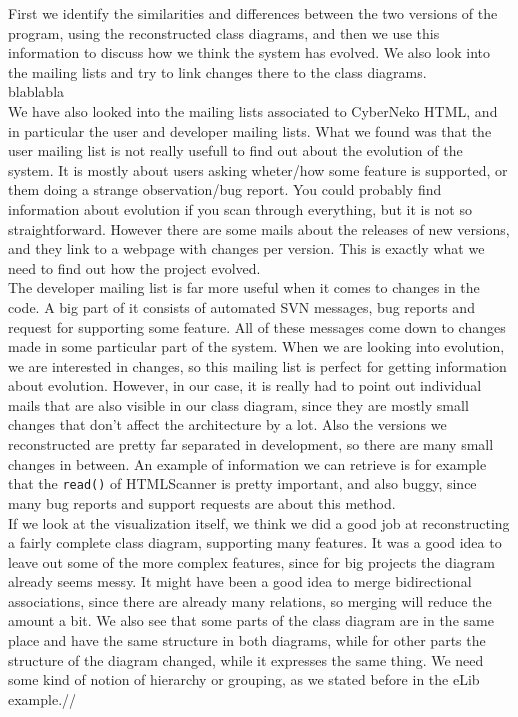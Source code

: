 \documentclass[a4paper,11pt]{article}
\begin{document}
			First we identify the similarities and differences between the two versions of the program, using the reconstructed class diagrams, and then we use this information to discuss how we think the system has evolved. We also look into the mailing lists and try to link changes there to the class diagrams. \\
			
			blablabla \\
			
			We have also looked into the mailing lists associated to CyberNeko HTML, and in particular the user and developer mailing lists. What we found was that the user mailing list is not really usefull to find out about the evolution of the system. It is mostly about users asking wheter/how some feature is supported, or them doing a strange observation/bug report. You could probably find information about evolution if you scan through everything, but it is not so straightforward. However there are some mails about the releases of new versions, and they link to a webpage with changes per version. This is exactly what we need to find out how the project evolved. \\

			The developer mailing list is far more useful when it comes to changes in the code. A big part of it consists of automated SVN messages, bug reports and request for supporting some feature. All of these messages come down to changes made in some particular part of the system. When we are looking into evolution, we are interested in changes, so this mailing list is perfect for getting information about evolution. However, in our case, it is really had to point out individual mails that are also visible in our class diagram, since they are mostly small changes that don't affect the architecture by a lot. Also the versions we reconstructed are pretty far separated in development, so there are many small changes in between. An example of information we can retrieve is for example that the \texttt{read()} of HTMLScanner is pretty important, and also buggy, since many bug reports and support requests are about this method. \\
			
			If we look at the visualization itself, we think we did a good job at reconstructing a fairly complete class diagram, supporting many features. It was a good idea to leave out some of the more complex features, since for big projects the diagram already seems messy. It might have been a good idea to merge bidirectional associations, since there are already many relations, so merging will reduce the amount a bit. We also see that some parts of the class diagram are in the same place and have the same structure in both diagrams, while for other parts the structure of the diagram changed, while it expresses the same thing. We need some kind of notion of hierarchy or grouping, as we stated before in the eLib example.//
\end{document}
